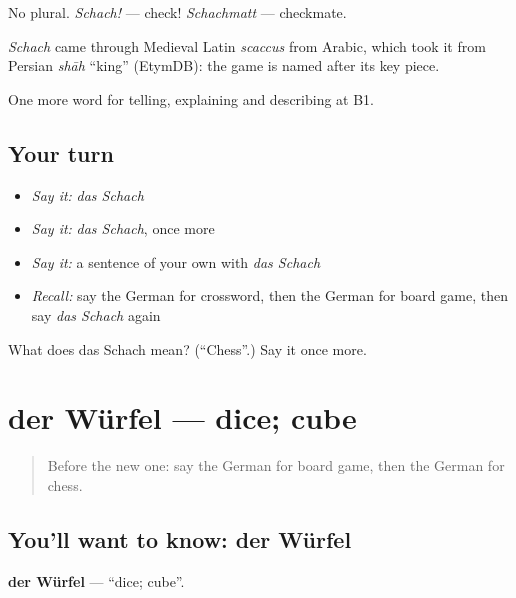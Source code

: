 No plural. \emph{Schach!} — check! \emph{Schachmatt} — checkmate.

\begin{cousinweb}
\emph{Schach} came through Medieval Latin \emph{scaccus} from Arabic, which took it from Persian \emph{shāh} \textquotedblleft{}king\textquotedblright{} (EtymDB): the game is named after its key piece.
\end{cousinweb}

\begin{grammarlens}[title={What you've built}]
One more word for telling, explaining and describing at B1.
\end{grammarlens}

\subsection*{Your turn}
\begin{itemize}
\raggedright
  \item \emph{Say it:} \emph{das Schach}
  \item \emph{Say it:} \emph{das Schach}, once more
  \item \emph{Say it:} a sentence of your own with \emph{das Schach}
  \item \emph{Recall:} say the German for crossword, then the German for board game, then say \emph{das Schach} again
\end{itemize}

\begin{tcolorbox}[breakable,colback=teal!4,colframe=teal!35!black,title={Before you move on}]
What does das Schach mean? (\textquotedblleft{}Chess\textquotedblright{}.) Say it once more.
\end{tcolorbox}
\section[der Würfel]{der Würfel — dice; cube}

\label{lesson:GE-C501-wuerfel}



\begin{quote}
Before the new one: say the German for board game, then the German for chess.
\end{quote}

\subsection*{You'll want to know: der Würfel}
\textbf{der Würfel} — \textquotedblleft{}dice; cube\textquotedblright{}.

